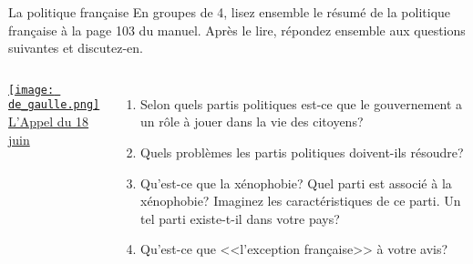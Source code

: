 \begin{frame}{La politique française}
  En groupes de 4, lisez ensemble le résumé de la politique française à la page 103 du manuel.
  Après le lire, répondez ensemble aux questions suivantes et discutez-en.
  \begin{columns}
      \begin{center}
        \href{https://www.youtube.com/watch?v=_3iEBJO2AV0}{\texttt{[image: de\_gaulle.png]}} \\
        \href{https://www.youtube.com/watch?v=ung6UiY3YY4}{L'Appel du 18 juin}
      \end{center}
      \begin{enumerate}
        \item Selon quels partis politiques est-ce que le gouvernement a un rôle à jouer dans la vie des citoyens?
        \item Quels problèmes les partis politiques doivent-ils résoudre?
        \item Qu'est-ce que la xénophobie? Quel parti est associé à la xénophobie? Imaginez les caractéristiques de ce parti. Un tel parti existe-t-il dans votre pays?
        \item Qu'est-ce que <<l'exception française>> à votre avis?
      \end{enumerate}
  \end{columns}
\end{frame}
